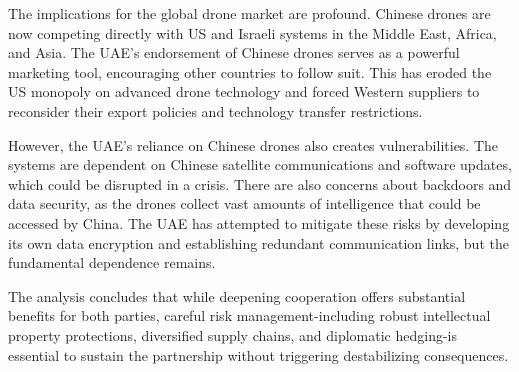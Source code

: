 \documentclass[10pt,a4paper]{article}
\begin{document}
{\small The implications for the global drone market are profound. Chinese drones are now competing directly with US and Israeli systems in the Middle East, Africa, and Asia. The UAE's endorsement of Chinese drones serves as a powerful marketing tool, encouraging other countries to follow suit. This has eroded the US monopoly on advanced drone technology and forced Western suppliers to reconsider their export policies and technology transfer restrictions.}\par
{\small However, the UAE's reliance on Chinese drones also creates vulnerabilities. The systems are dependent on Chinese satellite communications and software updates, which could be disrupted in a crisis. There are also concerns about backdoors and data security, as the drones collect vast amounts of intelligence that could be accessed by China. The UAE has attempted to mitigate these risks by developing its own data encryption and establishing redundant communication links, but the fundamental dependence remains.}\par
{\small The analysis concludes that while deepening cooperation offers substantial benefits for both parties, careful risk management-including robust intellectual property protections, diversified supply chains, and diplomatic hedging-is essential to sustain the partnership without triggering destabilizing consequences.}\par
\label{chap:3:end}
\end{document}
